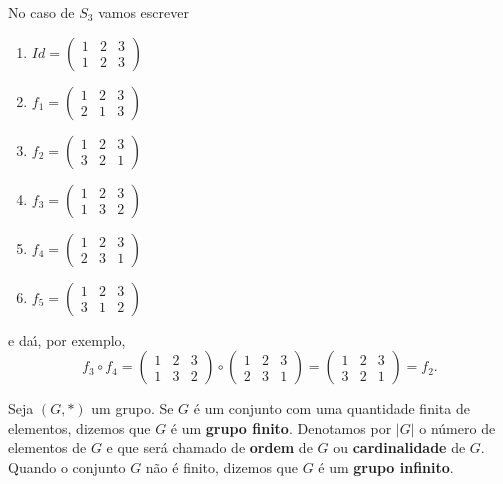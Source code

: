 No caso de $S_3$ vamos escrever
\begin{multicols}{3}
	\begin{enumerate}
		\item[] $Id = \begin{pmatrix}
			1 & 2 & 3\\
			1 & 2 & 3
		\end{pmatrix}$
		\item[] $f_1 = \begin{pmatrix}
			1 & 2 & 3\\
			2 & 1 & 3
		\end{pmatrix}$
		\item[] $f_2 = \begin{pmatrix}
			1 & 2 & 3\\
			3 & 2 & 1
		\end{pmatrix}$
		\item[] $f_3 = \begin{pmatrix}
			1 & 2 & 3\\
			1 & 3 & 2
		\end{pmatrix}$
		\item[] $f_4 = \begin{pmatrix}
			1 & 2 & 3\\
			2 & 3 & 1
		\end{pmatrix}$
		\item[] $f_5 = \begin{pmatrix}
			1 & 2 & 3\\
			3 & 1 & 2
		\end{pmatrix}$
	\end{enumerate}
\end{multicols}
e da{\'\i}, por exemplo,
\[
	f_3\circ f_4 = \begin{pmatrix}
			1 & 2 & 3\\
			1 & 3 & 2
		\end{pmatrix} \circ \begin{pmatrix}
			1 & 2 & 3\\
			2 & 3 & 1
		\end{pmatrix} = \begin{pmatrix}
			1 & 2 & 3\\
			3 & 2 & 1
		\end{pmatrix} = f_2.
\]



\begin{definicao}
	Seja $(G,*)$ um grupo. Se $G$ {\'e} um conjunto com uma quantidade finita de elementos, dizemos que $G$ {\'e} um \textbf{grupo finito}. Denotamos por $|G|$ o n{\'u}mero de elementos de $G$ e que ser{\'a} chamado de \textbf{ordem} de $G$ ou \textbf{cardinalidade} de $G$. Quando o conjunto $G$ n{\~a}o {\'e} finito, dizemos que $G$ {\'e} um \textbf{grupo infinito}.
\end{definicao}


